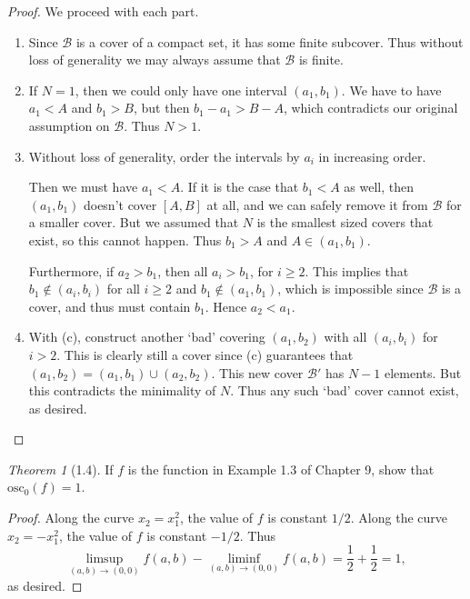 \documentclass[12pt]{article}
\theoremstyle{remark}
\theoremstyle{named}
\newtheorem*{theorem}{Theorem}
\begin{document}
\begin{proof}
    We proceed with each part.
    \begin{enumerate}
        \item Since \(\mathcal B\) is a cover of a compact set, it has some finite subcover. Thus without loss of generality we may always assume that \(\mathcal B\) is finite.
        \item If \(N = 1\), then we could only have one interval \((a_1, b_1)\). We have to have \(a_1 < A\) and \(b_1 > B\), but then \(b_1 - a_1 > B - A\), which contradicts our original assumption on \(\mathcal B\). Thus \(N > 1\).
        \item Without loss of generality, order the intervals by \(a_i\) in increasing order. 
        
        Then we must have \(a_1 < A\). If it is the case that \(b_1 < A\) as well, then \((a_1, b_1)\) doesn't cover \([A, B]\) at all, and we can safely remove it from \(\mathcal B\) for a smaller cover. But we assumed that \(N\) is the smallest sized covers that exist, so this cannot happen. Thus \(b_1 > A\) and \(A \in (a_1, b_1)\).

        Furthermore, if \(a_2 > b_1\), then all \(a_i > b_1\), for \(i \geq 2\). This implies that \(b_1 \notin (a_i, b_i)\) for all \(i \geq 2\) and \(b_1 \notin (a_1, b_1)\), which is impossible since \(\mathcal B\) is a cover, and thus must contain \(b_1\). Hence \(a_2 < a_1\). 
        \item With (c), construct another `bad' covering \((a_1, b_2)\) with all \((a_i, b_i)\) for \(i > 2\). This is clearly still a cover since (c) guarantees that \((a_1, b_2) = (a_1, b_1) \cup (a_2, b_2)\). This new cover \(\mathcal B'\) has \(N - 1\) elements. But this contradicts the minimality of \(N\). Thus any such `bad' cover cannot exist, as desired. 
    \end{enumerate}
\end{proof}

\begin{theorem}[1.4]
    If \(f\) is the function in Example 1.3 of Chapter 9, show that \(\text{osc}_0(f) = 1\).
\end{theorem}

\begin{proof}
    Along the curve \(x_2 = x_1^2\), the value of \(f\) is constant \(1/2\). Along the curve \(x_2 = -x_1^2\), the value of \(f\) is constant \(-1/2\). Thus
    \[\limsup_{(a, b) \to (0, 0)} f(a, b) - \liminf_{(a, b) \to (0, 0)} f(a, b) = \frac{1}{2} + \frac{1}{2} = 1,\]
    as desired.
\end{proof}
\end{document}
